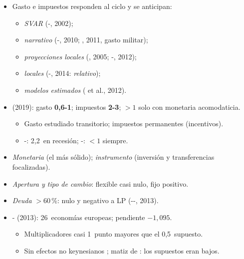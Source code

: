 \documentclass{article}
\begin{document}
\begin{columnas}
\begin{itemize}
\item Gasto e impuestos responden al ciclo y se anticipan:
  \begin{itemize}
  \item \emph{SVAR} (-, 2002);
  \item \emph{narrativo} (-, 2010; , 2011, gasto militar);
  \item \emph{proyecciones locales} (, 2005; -, 2012);
  \item \emph{locales} (-, 2014: \emph{relativo});
  \item \emph{modelos estimados} ( et al., 2012).
  \end{itemize}
\end{itemize}
\begin{itemize}
\item {} (2019): gasto \textbf{0,6-1}; impuestos \textbf{2-3}; $>1$ solo con monetaria acomodaticia.
  \begin{itemize}
  \item Gasto estudiado transitorio; impuestos permanentes (incentivos).
  \item {}-: 2,2~en recesión; -: $<1$ siempre.
  \end{itemize}
\end{itemize}
\begin{itemize}
\item \emph{Monetaria} (el más sólido); \emph{instrumento} (inversión y transferencias focalizadas).
\item \emph{Apertura y tipo de cambio}: flexible casi nulo, fijo positivo.
\item \emph{Deuda} $>60$\,\%: nulo y negativo a LP (--, 2013).
\end{itemize}
\begin{itemize}
\item {}- (2013): 26~economías europeas; pendiente $-1{,}095$.
  \begin{itemize}
  \item Multiplicadores casi 1~punto mayores que el 0,5~supuesto.
  \item Sin efectos no keynesianos ; matiz de : los supuestos eran bajos.
  \end{itemize}
\end{itemize}


\end{columnas}
\end{document}
